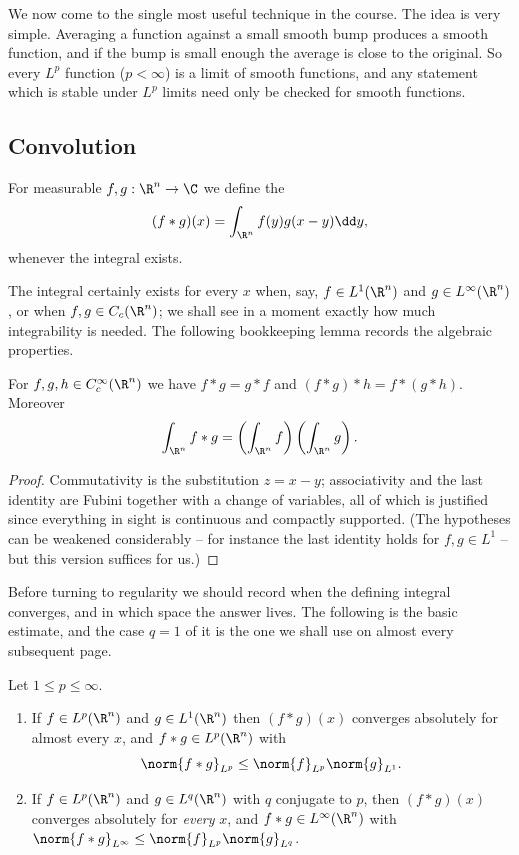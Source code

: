 We now come to the single most useful technique in the course. The idea is very simple. Averaging a function against a small smooth bump produces a smooth function, and if the bump is small enough the average is close to the original. So every $L^p$ function ($p< \infty$) is a limit of smooth functions, and any statement which is stable under $L^p$ limits need only be checked for smooth functions.

\subsection{Convolution}

\begin{definition}[Convolution]
	For measurable $f, g : \R^n \to \C$ we define the 
	$$(f*g)(x) = \int_{\R^n} f(y) g(x-y) \dd y,$$
	whenever the integral exists.
\end{definition}

The integral certainly exists for every $x$ when, say, $f \in L^1(\R^n)$ and $g \in L^\infty(\R^n)$, or when $f, g \in C_c(\R^n)$; we shall see in a moment exactly how much integrability is needed. The following bookkeeping lemma records the algebraic properties.

\begin{lemma}\label{lem:convalg}
	For $f, g, h \in C_c^\infty(\R^n)$ we have $f * g = g*f$ and $(f*g)*h = f*(g*h)$. Moreover
	$$\int_{\R^n} f * g = \left(\int_{\R^n} f\right)\left(\int_{\R^n} g \right).$$
\end{lemma}

\begin{proof}
	Commutativity is the substitution $z = x - y$; associativity and the last identity are Fubini together with a change of variables, all of which is justified since everything in sight is continuous and compactly supported. (The hypotheses can be weakened considerably -- for instance the last identity holds for $f, g \in L^1$ -- but this version suffices for us.)
\end{proof}

Before turning to regularity we should record when the defining integral converges, and in which space the answer lives. The following is the basic estimate, and the case $q = 1$ of it is the one we shall use on almost every subsequent page.

\begin{theorem}\label{thm:youngconv}
	Let $1 \le p \le \infty$.
	\begin{enumerate}[label=(\roman*)]
		\item If $f \in L^p(\R^n)$ and $g \in L^1(\R^n)$ then $(f*g)(x)$ converges absolutely for almost every $x$, and $f * g \in L^p(\R^n)$ with
		$$\norm{f*g}_{L^p}\le\norm{f}_{L^p}\norm{g}_{L^1}.$$
		\item If $f \in L^p(\R^n)$ and $g \in L^q(\R^n)$ with $q$ conjugate to $p$, then $(f*g)(x)$ converges absolutely for \emph{every} $x$, and $f * g \in L^\infty(\R^n)$ with $\norm{f*g}_{L^\infty}\le\norm{f}_{L^p}\norm{g}_{L^q}$.
	\end{enumerate}
\end{theorem}

